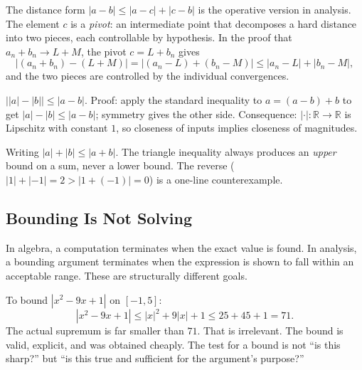 \begin{remark}
The distance form $|a-b|\leq|a-c|+|c-b|$ is the operative version in
analysis. The element $c$ is a \emph{pivot}: an intermediate point that
decomposes a hard distance into two pieces, each controllable by hypothesis.
In the proof that $a_n+b_n\to L+M$, the pivot $c=L+b_n$ gives
\[
  |(a_n+b_n)-(L+M)|
  =|(a_n-L)+(b_n-M)|
  \leq|a_n-L|+|b_n-M|,
\]
and the two pieces are controlled by the individual convergences.
\end{remark}

\begin{remark}
\label{rem:reverse-tri}
$\bigl\lvert|a|-|b|\bigr\rvert\leq|a-b|$. Proof: apply the standard
inequality to $a=(a-b)+b$ to get $|a|-|b|\leq|a-b|$; symmetry gives the
other side. Consequence: $|\cdot|:\mathbb{R}\to\mathbb{R}$ is Lipschitz
with constant $1$, so closeness of inputs implies closeness of magnitudes.
\end{remark}

\begin{remark}
Writing $|a|+|b|\leq|a+b|$. The triangle inequality always produces an
\emph{upper} bound on a sum, never a lower bound. The reverse
($|1|+|-1|=2>|1+(-1)|=0$) is a one-line counterexample.
\end{remark}



\subsection*{Bounding Is Not Solving}
\label{subsec:bounding-not-solving}

In algebra, a computation terminates when the exact value is found. In
analysis, a bounding argument terminates when the expression is shown to
fall within an acceptable range. These are structurally different goals.

\begin{remark}
To bound $|x^2-9x+1|$ on $[-1,5]$:
\[
  |x^2-9x+1|\leq|x|^2+9|x|+1\leq 25+45+1=71.
\]
The actual supremum is far smaller than $71$. That is irrelevant. The bound
is valid, explicit, and was obtained cheaply. The test for a bound is not
``is this sharp?'' but ``is this true and sufficient for the argument's
purpose?''
\end{remark}


